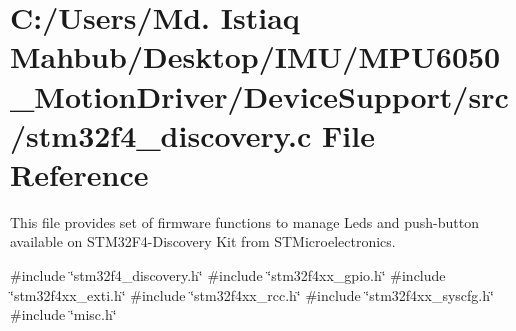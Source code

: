 \section{C\+:/\+Users/\+Md. Istiaq Mahbub/\+Desktop/\+I\+M\+U/\+M\+P\+U6050\+\_\+\+Motion\+Driver/\+Device\+Support/src/stm32f4\+\_\+discovery.c File Reference}
\label{stm32f4__discovery_8c}


This file provides set of firmware functions to manage Leds and push-\/button available on S\+T\+M32\+F4-\/\+Discovery Kit from S\+T\+Microelectronics.  


{\ttfamily \#include \char`\"{}stm32f4\+\_\+discovery.\+h\char`\"{}}\newline
{\ttfamily \#include \char`\"{}stm32f4xx\+\_\+gpio.\+h\char`\"{}}\newline
{\ttfamily \#include \char`\"{}stm32f4xx\+\_\+exti.\+h\char`\"{}}\newline
{\ttfamily \#include \char`\"{}stm32f4xx\+\_\+rcc.\+h\char`\"{}}\newline
{\ttfamily \#include \char`\"{}stm32f4xx\+\_\+syscfg.\+h\char`\"{}}\newline
{\ttfamily \#include \char`\"{}misc.\+h\char`\"{}}\newline
